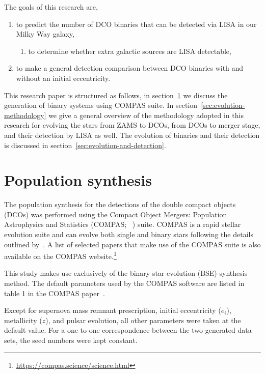 \documentclass[twocolumn, twocolappendix]{aastex63}
\begin{document}
    The goals of this research are,
    \begin{enumerate}%
        \item to predict the number of DCO binaries that can be detected via LISA in our Milky Way galaxy,
        \begin{enumerate}
            \item to determine whether extra galactic sources are LISA detectable,
        \end{enumerate}
        \item to make a general detection comparison between DCO binaries with and without an initial eccentricity.
    \end{enumerate}%

    This research paper is structured as follows, in section~\ref{sec:population_synthesis} we discuss the generation of binary systems using COMPAS suite.
    In section~\ref{sec:evolution-methodology} we give a general overview of the methodology adopted in this research for evolving the stars from ZAMS to DCOs, from DCOs to merger stage, and their detection by LISA as well.
    The evolution of binaries and their detection is discussed in section~\ref{sec:evolution-and-detection}.


    \section{Population synthesis}
    \label{sec:population_synthesis}
    The population synthesis for the detections of the double compact objects (DCOs) was performed using the Compact Object Mergers: Population Astrophysics and Statistics (COMPAS; ~\cite{Stevenson2017, Vigna2018, Riley2022}) suite.
    COMPAS is a rapid stellar evolution suite and can evolve both single and binary stars following the details outlined by~\citet{Hurley2000, Hurley2002}.
    A list of selected papers that make use of the COMPAS suite is also available on the COMPAS website.\footnote{\url{https://compas.science/science.html}}

    This study makes use exclusively of the binary star evolution (BSE) synthesis method.
    The default parameters used by the COMPAS software are listed in table 1 in the COMPAS paper~\citep{Riley2022}.

    Except for supernova mass remnant prescription, initial eccentricity ($e_i$), metallicity ($z$), and pulsar evolution, all other parameters were taken at the default value.
    For a one-to-one correspondence between the two generated data sets, the seed numbers were kept constant.
\end{document}

